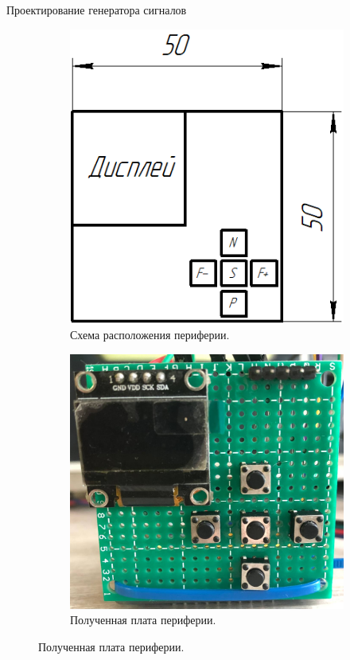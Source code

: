 \documentclass[10pt]{beamer}
\begin{document}
\begin{frame}{Проектирование генератора сигналов}
\begin{figure}
     \begin{subfigure}[H]{0.45\textwidth}
         \centering
         \includegraphics[width=\textwidth]{func_gen}
         \caption*{Схема расположения периферии.}
     \end{subfigure}
     \hfill
     \begin{subfigure}[H]{0.5\textwidth}
         \centering
         \includegraphics[width=\textwidth]{m1}
         \caption*{Полученная плата периферии.}
     \end{subfigure}
\end{figure}
\end{frame}
\end{document}
